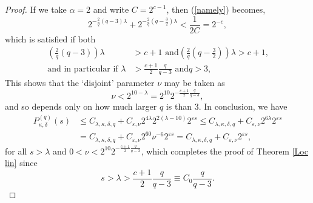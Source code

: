 \documentclass{amsart}%
\theoremstyle{plain}
\numberwithin{equation}{section}
\begin{document}
\begin{proof}
If we take $\alpha=2$ and write $C=2^{c-1}$, then (\ref{namely}) becomes,%
\[
2^{-\frac{2}{q}\left(  q-3\right)  \lambda}+2^{-\frac{2}{q}\left(  q-\frac
{3}{2}\right)  \lambda}<\frac{1}{2C}=2^{-c},
\]
which is satisfied if both
\begin{align*}
\left(  \frac{2}{q}\left(  q-3\right)  \right)  \lambda &  >c+1\text{ and
}\left(  \frac{2}{q}\left(  q-\frac{3}{2}\right)  \right)  \lambda
>c+1\text{,}\\
\text{and in particular if }\lambda &  >\frac{c+1}{2}\frac{q}{q-3}\text{ and
}q>3,
\end{align*}
This shows that the `disjoint' parameter $\nu$ may be taken as
\begin{equation}
\nu<2^{10-\lambda}=2^{10}2^{-\frac{c+1}{2}\frac{q}{q-3}},\label{nu}%
\end{equation}
and so depends only on how much larger $q$ is than $3$. In conclusion, we have%
\begin{align*}
P_{\kappa,\delta}^{\left(  q\right)  }\left(  s\right)   &  \leq
C_{\lambda,\kappa,\delta,q}+C_{\varepsilon,\nu}2^{4\lambda}2^{2\left(
\lambda-10\right)  }2^{\varepsilon s}\leq C_{\lambda,\kappa,\delta
,q}+C_{\varepsilon,\nu}2^{6\lambda}2^{\varepsilon s}\\
&  =C_{\lambda,\kappa,\delta,q}+C_{\varepsilon,\nu}2^{60}\nu^{-6}%
2^{\varepsilon s}=C_{\lambda,\kappa,\delta,q}+C_{\varepsilon,\nu
}2^{\varepsilon s},
\end{align*}
for all $s>\lambda$ and $0<\nu<2^{10}2^{-\frac{c+1}{2}\frac{q}{q-3}}$, which
completes the proof of Theorem \ref{Loc lin} since%
\[
s>\lambda>\frac{c+1}{2}\frac{q}{q-3}\equiv C_{0}\frac{q}{q-3}.
\]

\end{proof}
\end{document}
